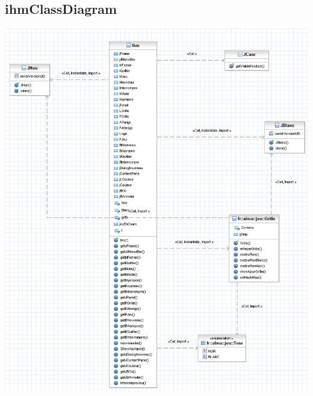 \documentclass{report}
\begin{document}
\subsection{ihmClassDiagram}
\begin{center}
\includegraphics[scale=0.30]{images/fralmaihmClassDiagram}
\end{center}
\end{document}
